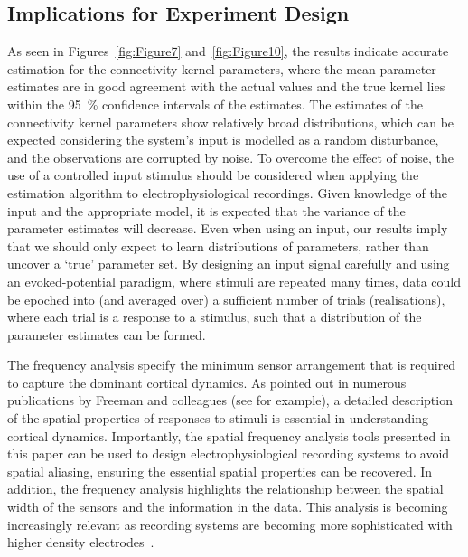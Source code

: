 \documentclass[12pt]{iopart}
\begin{document}
\subsection{Implications for Experiment Design}
As seen in Figures~\ref{fig:Figure7} and~\ref{fig:Figure10}, the results indicate accurate estimation for the connectivity kernel parameters, where the mean parameter estimates are in good agreement with the actual values and the true kernel lies within the 95~\% confidence intervals of the estimates. The estimates of the connectivity kernel parameters show relatively broad distributions, which can be expected considering the system's input is modelled as a random disturbance, and the observations are corrupted by noise. To overcome the effect of noise, the use of a controlled input stimulus should be considered when applying the estimation algorithm to electrophysiological recordings. Given knowledge of the input and the appropriate model, it is expected that the variance of the parameter estimates will decrease. Even when using an input, our results imply that we should only expect to learn distributions of parameters, rather than uncover a `true' parameter set. By designing an input signal carefully and using an evoked-potential paradigm, where stimuli are repeated many times, data could be epoched into (and averaged over) a sufficient number of trials (realisations), where each trial is a response to a stimulus, such that a distribution of the parameter estimates can be formed.

The frequency analysis specify the minimum sensor arrangement that is required to capture the dominant cortical dynamics. As pointed out in numerous publications by Freeman and colleagues (see \cite{Freeman1987} for example), a detailed description of the spatial properties of responses to stimuli is essential in understanding cortical dynamics. Importantly, the spatial frequency analysis tools presented in this paper can be used to design electrophysiological recording systems to avoid spatial aliasing, ensuring the essential spatial properties can be recovered. In addition, the frequency analysis highlights the relationship between the spatial width of the sensors and the information in the data. This analysis is becoming increasingly relevant as recording systems are becoming more sophisticated with higher density electrodes~\cite{Brinkmann2009}.
\end{document}
